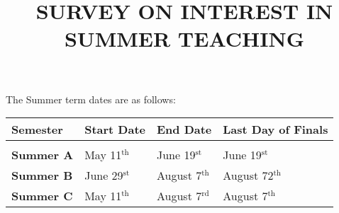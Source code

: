 \documentclass{article}
\title{SURVEY ON INTEREST IN SUMMER \arabic{currentYear} TEACHING}
\newcounter{currentYear}
\newcommand{\Config}[9]{%
    
    
    
    \newcommand{\SumAS}{%
    #1
    }
    \newcommand{\SumAE}{%
    #2
    }
    \newcommand{\SumAFin}{%
    #3
    }
    \newcommand{\SumBS}{%
    #4
    }
    \newcommand{\SumBE}{%
    #5
    }
    \newcommand{\SumBFin}{%
    #6
    }
    \newcommand{\SumCS}{%
    #7
    }
    \newcommand{\SumCE}{%
    #8
    }
    \newcommand{\SumCFin}{%
    #9
    }
}
\newcommand{\due}[2]{
    \newcommand{\dueDate}{\textbf{#1}\relax}
    \newcommand{\dueRecipient}{\textbf{#2}\relax}
}
\begin{document}

\Config
	{%
	May 11$^{\text{th}}$
	}
	{%
	June 19$^{\text{st}}$
	}
	{%
	June 19$^{\text{st}}$
	}
	{%
	June 29$^{\text{st}}$
	}
	{%
	August 7$^{\text{th}}$
	}
	{%
	August 72$^{\text{th}}$
	}
	{%
	May 11$^{\text{th}}$
	}
	{%
	August 7$^{\text{rd}}$
	}
	{%
	August 7$^{\text{th}}$
	}

\due{%
Noon, January 31$^{\text{st}}$
}{%
Sandra Gagnon
}


\date{}
\maketitle
\vspace{-2cm}

The Summer   term dates are as follows:
\vspace{5pt}

\begin{tabular}{llll}
\textbf{\Large{Semester}} & \large{Start Date} & \large{End Date} & \large{Last Day of Finals}\\\hline &&&\\
\textbf{Summer A} & \SumAS & \SumAE & \SumAFin \\[5pt]
\textbf{Summer B} & \SumBS & \SumBE & \SumBFin \\[5pt]
\textbf{Summer C} & \SumCS & \SumCE & \SumCFin \\

\end{tabular}
\end{document}
